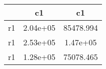\begin{table}[htbp]
\begin{tabular}{lcc} \hline \hline
 & c1  & c1  \\  \hline 
r1 &  2.04e+05 & 85478.994 \\  
r1 &  2.53e+05 &  1.47e+05 \\  
r1 &  1.28e+05 & 75078.465 \\  
\hline \hline \end{tabular}
\end{table}
